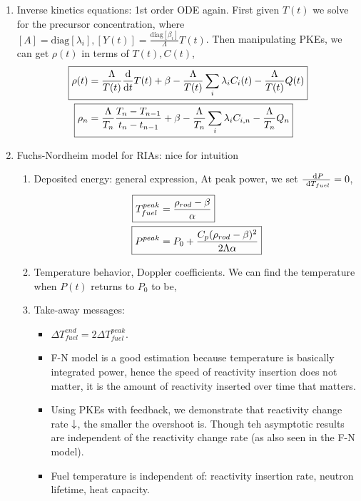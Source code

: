 \documentclass{school-22.211-notes}
\begin{document}
\begin{enumerate}
\item Inverse kinetics equations: 1st order ODE again. First given $T(t)$ we solve for the precursor concentration,
where $[A] = \mathrm{diag}[\lambda_i], [Y(t)] = \frac{\mathrm{diag}[\beta_i]}{\Lambda} T(t)$. Then manipulating PKEs, we can get $\rho(t)$ in terms of $T(t), C(t)$, 
\begin{align}
\Aboxed{\rho(t) &= \frac{\Lambda}{T(t)} \ddt T(t) + \beta - \frac{\Lambda}{T(t)} \Sum_i \lambda_i C_i(t) - \frac{\Lambda}{T(t)} Q(t) } \\
\Aboxed{ \rho_n &= \frac{\Lambda}{T_n} \frac{T_n - T_{n-1}}{t_n - t_{n-1}} + \beta - \frac{\Lambda}{T_n} \Sum_i \lambda_i C_{i,n} - \frac{\Lambda}{T_n} Q_n } 
\end{align}

\item Fuchs-Nordheim model for RIAs: nice for intuition
  \begin{enumerate}
    \item Deposited energy: general expression, 
      At peak power, we set $\frac{\mbox{ }\mathrm{d} P}{\mbox{ }\mathrm{d} T_{fuel}} = 0$, 
      \begin{align}
        \Aboxed{ T_{fuel}^{peak} &= \frac{\rho_{rod} - \beta}{\alpha} } \\
        \Aboxed{ P^{peak} &= P_0 + \frac{C_p (\rho_{rod} - \beta)^2}{2 \Lambda \alpha} }
      \end{align}

    \item Temperature behavior, Doppler coefficients. We can find the temperature when $P(t)$ returns to $P_0$ to be,     

    \item Take-away messages:
      \begin{itemize}
      \item $\Delta T_{fuel}^{end} = 2 \Delta T_{fuel}^{peak}$. 
      \item F-N model is a good estimation because temperature is basically integrated power, hence the speed of reactivity insertion does not matter, it is the amount of reactivity inserted over time that matters. 
      \item Using PKEs with feedback, we demonstrate that reactivity change rate $\downarrow$, the smaller the overshoot is. Though teh asymptotic results are independent of the reactivity change rate (as also seen in the F-N model). 
      \item Fuel temperature is independent of: reactivity insertion rate, neutron lifetime, heat capacity. 
      \end{itemize}
  \end{enumerate}


\end{enumerate}
\end{document}
